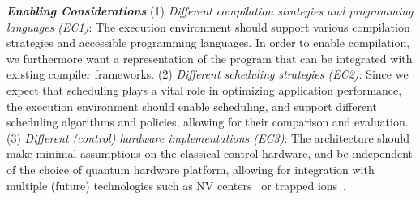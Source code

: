 \noindent\textit{\textbf{Enabling Considerations}}
(1) \textit{Different compilation strategies and programming languages (EC1)}: The execution environment should support various compilation strategies and accessible programming languages. 
In order to enable compilation, we furthermore want a representation of the program that can be integrated with existing compiler frameworks.
(2) \textit{Different scheduling strategies (EC2)}: Since we expect that scheduling plays a vital role in optimizing application performance, the execution environment should enable scheduling, and support different scheduling algorithms and policies, 
allowing for their comparison and evaluation.
(3) \textit{Different (control) hardware implementations (EC3)}: The architecture should make minimal assumptions on the classical control hardware, and be independent of the choice of quantum hardware platform, allowing for integration with multiple (future) technologies such as NV centers~\cite{pompili2022experimental} or trapped ions~\cite{drmota2023robust}.

